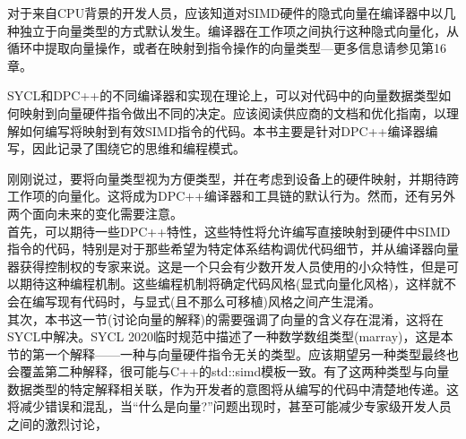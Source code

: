 对于来自CPU背景的开发人员，应该知道对SIMD硬件的隐式向量在编译器中以几种独立于向量类型的方式默认发生。编译器在工作项之间执行这种隐式向量化，从循环中提取向量操作，或者在映射到指令操作的向量类型—更多信息请参见第16章。\par

\begin{tcolorbox}[colback=blue!5!white,colframe=blue!75!black, title=其他可能的实现]
SYCL和DPC++的不同编译器和实现在理论上，可以对代码中的向量数据类型如何映射到向量硬件指令做出不同的决定。应该阅读供应商的文档和优化指南，以理解如何编写将映射到有效SIMD指令的代码。本书主要是针对DPC++编译器编写，因此记录了围绕它的思维和编程模式。
\end{tcolorbox}

\begin{tcolorbox}[colback=blue!5!white,colframe=blue!75!black, title=变化即将发生]
刚刚说过，要将向量类型视为方便类型，并在考虑到设备上的硬件映射，并期待跨工作项的向量化。这将成为DPC++编译器和工具链的默认行为。然而，还有另外两个面向未来的变化需要注意。\\

首先，可以期待一些DPC++特性，这些特性将允许编写直接映射到硬件中SIMD指令的代码，特别是对于那些希望为特定体系结构调优代码细节，并从编译器向量器获得控制权的专家来说。这是一个只会有少数开发人员使用的小众特性，但是可以期待这种编程机制。这些编程机制将确定代码风格(显式向量化风格)，这样就不会在编写现有代码时，与显式(且不那么可移植)风格之间产生混淆。\\

其次，本书这一节(讨论向量的解释)的需要强调了向量的含义存在混淆，这将在SYCL中解决。SYCL 2020临时规范中描述了一种数学数组类型(marray)，这是本节的第一个解释——一种与向量硬件指令无关的类型。应该期望另一种类型最终也会覆盖第二种解释，很可能与C++的std::simd模板一致。有了这两种类型与向量数据类型的特定解释相关联，作为开发者的意图将从编写的代码中清楚地传递。这将减少错误和混乱，当“什么是向量?”问题出现时，甚至可能减少专家级开发人员之间的激烈讨论，
\end{tcolorbox}

































